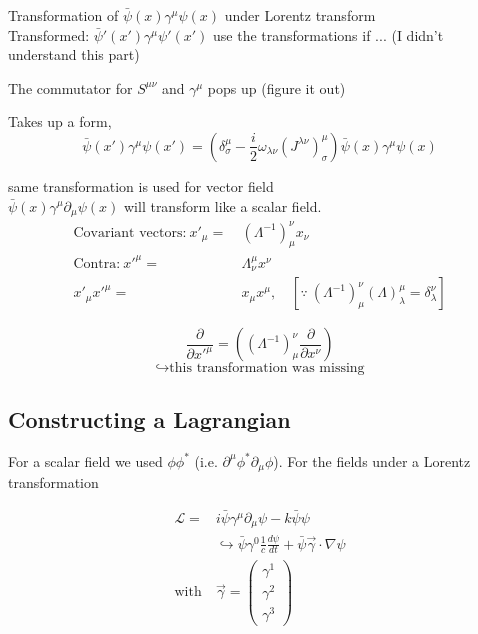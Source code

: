 \documentclass[11pt]{article}
\newcommand{\lag}{\mathcal{L}}
\begin{document}
Transformation of $\bar{\psi}(x)\gamma^\mu \psi(x)$ under Lorentz transform\\

Transformed: $\bar{\psi}'(x')\gamma^\mu\psi'(x')$ use the transformations if ... (I didn't understand this part)

The commutator for $S^{\mu\nu}$ and $\gamma^\mu$ pops up (figure it out)

Takes up a form,
\[ \bar{\psi}(x') \gamma^\mu \psi(x') = \left(\delta^\mu_\sigma - \frac{i}{2}\omega_{\lambda\nu}(J^{\lambda\nu})^\mu_\sigma\right)\bar{\psi}(x)\gamma^\mu \psi (x) \]

same transformation is used for vector field \\

$\bar{\psi}(x)\gamma^\mu \partial_\mu \psi(x)$ will transform like a scalar field.\\

\begin{align*}
	\text{Covariant vectors:}\ x'_\mu =&\ (\Lambda^{-1})^\nu_\mu x_\nu\\
	\text{Contra:}\ x'^\mu =&\ \Lambda^\mu_\nu x^\nu\\
	x'_\mu x'^\mu =&\ x_\mu x^\mu, \quad \left[\because\ (\Lambda^{-1})^\nu_\mu (\Lambda)^\mu_\lambda = \delta^\nu_\lambda\right] 
\end{align*}

	 \[\frac{\partial}{\partial x'^\mu} = \left((\Lambda^{-1})^\nu_\mu \frac{\partial}{\partial x^\nu}\right)\]
\[ \hookrightarrow \text{this transformation was missing}\]
	
\subsection*{Constructing a Lagrangian}
For a scalar field we used $\phi \phi^*$ (i.e. $\partial^\mu \phi^* \partial_\mu\phi$). For the fields under a Lorentz transformation 

\begin{align*}
	\lag =& i\bar{\psi}\gamma^\mu\partial_\mu\psi - k\bar{\psi}\psi\\
	& \hookrightarrow \bar{\psi}\gamma^0 \frac{1}{c}\frac{d\psi}{dt} + \bar{\psi}\vec{\gamma}\cdot \nabla \psi\\
	\text{with}\ & \vec{\gamma} = \begin{pmatrix}\gamma^1 \\ \gamma^2 \\ \gamma^3 \end{pmatrix} \\
\end{align*}
\end{document}
